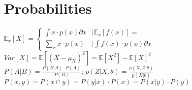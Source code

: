 \section*{Probabilities}
$\mathbb{E}_x[X] = \begin{cases}
   \int x \cdot p(x) \partial x  &|\mathbb{E}_x[f(x)] =\\
   \sum_x x \cdot p(x) &|\int f(x) \cdot p(x) \partial x
  \end{cases}$\\
$Var[X] = \mathbb{E}[(X-\mu_X)^2] = \mathbb{E}[X^2] - \mathbb{E}[X]^2$\\
$P(A|B) = \frac{P(B|A) \cdot P(A)}{P(B)}$; $p(Z|X,\theta) = \frac{p(X,Z|\theta)}{p(X|\theta)}$\\
$P(x,y) = P(x \cap y)= P(y|x) \cdot P(x) = P(x|y) \cdot P(y)$


